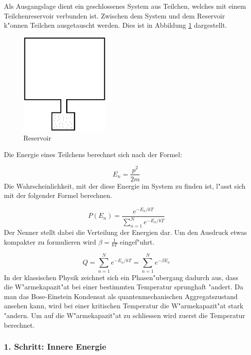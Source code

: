 \begin{refsection}
Als Ausgangslage dient ein geschlossenes System aus Teilchen, welches mit einem Teilchenreservoir verbunden ist. 
Zwischen dem System und dem Reservoir k"onnen Teilchen ausgetauscht werden. Dies ist in Abbildung \ref{fig:reservoir} dargestellt.

\begin{figure}
	\centering
	\includegraphics[width = 0.4\textwidth]{./bose/reservoir.png}
	\caption{Reservoir}
	\label{fig:reservoir}
\end{figure}
Die Energie eines Teilchens berechnet sich nach der Formel:

\begin{equation}
   E_n = \frac{p^2}{2m}
\end{equation}
Die Wahrscheinlichkeit, mit der diese Energie im System zu finden ist, l"asst sich mit der folgender Formel berechnen.

\begin{equation}
    P(E_n) = \frac{e^{-E_n/kT}}{\sum\limits_{n = 1}^{N} e^{-E_n/kT}}    
\end{equation}
Der Nenner stellt dabei die Verteilung der Energien dar. Um den Ausdruck etwas kompakter zu formulieren wird $ \beta = \frac{1}{kT}$ eingef"uhrt.

\begin{equation}
    Q = \sum\limits_{n = 1}^{N} e^{-E_n/kT} = \sum\limits_{n = 1}^{N} e^{-\beta E_n}
\end{equation}
In der klassischen Physik zeichnet sich ein Phasen"ubergang dadurch aus, dass die W"armekapazit"at bei einer bestimmten Temperatur sprunghaft "andert. Da man das Bose-Einstein Kondensat als quantenmechanischen Aggregatszustand ansehen kann, wird bei einer kritischen Temperatur die W"armekapazit"at stark "andern. Um auf die W"armekapazit"at zu schliessen wird zuerst die Temperatur berechnet.

\subsubsection{1. Schritt: Innere Energie}


\end{refsection}
